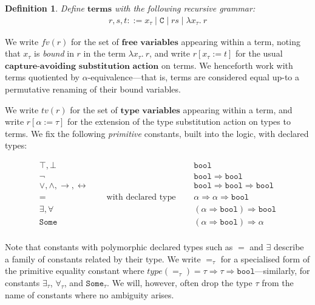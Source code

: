 \documentclass[a4paper, 10pt]{article}
\newtheorem{definition}{Definition}[section]
\newcommand{\deffont}[1]{\ensuremath{\textbf{#1}}}
\newcommand{\lam}[1]{\lambda{#1}.\ }
\begin{document}
\begin{definition}
\label{defn.terms}
Define \deffont{terms} with the following recursive grammar:
\begin{gather*}
r,s,t ::= x_\tau \mid \mathtt{C} \mid rs \mid \lam{x_\tau}r
\end{gather*}
\end{definition}

We write $fv(r)$ for the set of \deffont{free variables} appearing within a term, noting that $x_\tau$ is \emph{bound} in $r$ in the term $\lam{x_\tau}r$, and write $r[x_\tau := t]$ for the usual \deffont{capture-avoiding substitution action} on terms.
We henceforth work with terms quotiented by $\alpha$-equivalence---that is, terms are considered equal up-to a permutative renaming of their bound variables.

We write $tv(r)$ for the set of \deffont{type variables} appearing within a term, and write $r[\alpha := \tau]$ for the extension of the type substitution action on types to terms.
We fix the following \emph{primitive} constants, built into the logic, with declared types:

\begin{displaymath}
\begin{array}{ccc}
\top, \bot & & \mathtt{bool} \\
\neg & & \mathtt{bool} \Rightarrow \mathtt{bool} \\
\vee, \wedge, \longrightarrow, \longleftrightarrow &  & \mathtt{bool} \Rightarrow \mathtt{bool} \Rightarrow \mathtt{bool} \\
= & \quad\text{ with declared type }\quad & \alpha \Rightarrow \alpha \Rightarrow \mathtt{bool} \\
\exists, \forall & & (\alpha \Rightarrow \mathtt{bool}) \Rightarrow \mathtt{bool} \\
\mathtt{Some} & & (\alpha \Rightarrow \mathtt{bool}) \Rightarrow \alpha \\
\end{array}
\end{displaymath}

Note that constants with polymorphic declared types such as $=$ and $\exists$ describe a family of constants related by their type.
We write $=_\tau$ for a specialised form of the primitive equality constant where $type(=_\tau) = \tau \Rightarrow \tau \Rightarrow \mathtt{bool}$---similarly, for constants $\exists_\tau$, $\forall_\tau$, and $\mathtt{Some}_\tau$.
We will, however, often drop the type $\tau$ from the name of constants where no ambiguity arises.
\end{document}

